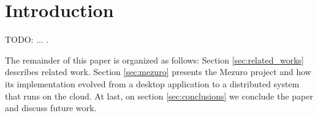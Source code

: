 \section{Introduction}
\label{introduction}


TODO: ... \cite{meirelles2013monitoramento}.

The remainder of this paper is organized as follows:
%
Section \ref{sec:related_works} describes related work.
%
Section \ref{sec:mezuro} presents the Mezuro project and how its implementation evolved from a desktop application to a distributed system that runs on the cloud.
%
At last, on section \ref{sec:conclusions} we conclude the paper and discuss future work.

